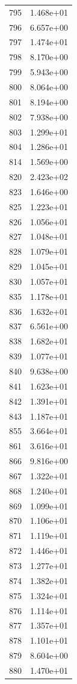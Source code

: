 \documentclass[12pt]{article}
\begin{document}
\begin{longtable}{@{}cc@{}}
795 & 1.468e+01 \\
796 & 6.657e+00 \\
797 & 1.474e+01 \\
798 & 8.170e+00 \\
799 & 5.943e+00 \\
800 & 8.064e+00 \\
801 & 8.194e+00 \\
802 & 7.938e+00 \\
803 & 1.299e+01 \\
804 & 1.286e+01 \\
814 & 1.569e+00 \\
820 & 2.423e+02 \\
823 & 1.646e+00 \\
825 & 1.223e+01 \\
826 & 1.056e+01 \\
827 & 1.048e+01 \\
828 & 1.079e+01 \\
829 & 1.045e+01 \\
830 & 1.057e+01 \\
835 & 1.178e+01 \\
836 & 1.632e+01 \\
837 & 6.561e+00 \\
838 & 1.682e+01 \\
839 & 1.077e+01 \\
840 & 9.638e+00 \\
841 & 1.623e+01 \\
842 & 1.391e+01 \\
843 & 1.187e+01 \\
855 & 3.664e+01 \\
861 & 3.616e+01 \\
866 & 9.816e+00 \\
867 & 1.322e+01 \\
868 & 1.240e+01 \\
869 & 1.099e+01 \\
870 & 1.106e+01 \\
871 & 1.119e+01 \\
872 & 1.446e+01 \\
873 & 1.277e+01 \\
874 & 1.382e+01 \\
875 & 1.324e+01 \\
876 & 1.114e+01 \\
877 & 1.357e+01 \\
878 & 1.101e+01 \\
879 & 8.604e+00 \\
880 & 1.470e+01 \\

\end{longtable}
\end{document}
